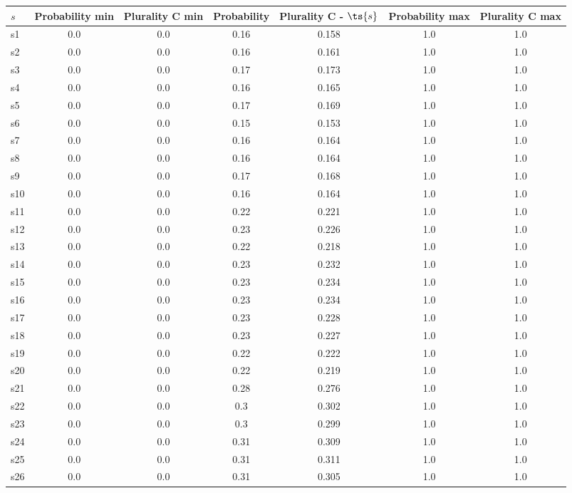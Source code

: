\documentclass{article}
\begin{document}
\noindent\begin{tabular}{|l|c|c|c|c|c|c|}
\hline
$s$& Probability min & Plurality C min & Probability & Plurality C - $\ts{s}$ & Probability max & Plurality C max\\
\hline
s1 &0.0 & 0.0 & 0.16 & 0.158 & 1.0 & 1.0\\
\hline
s2 &0.0 & 0.0 & 0.16 & 0.161 & 1.0 & 1.0\\
\hline
s3 &0.0 & 0.0 & 0.17 & 0.173 & 1.0 & 1.0\\
\hline
s4 &0.0 & 0.0 & 0.16 & 0.165 & 1.0 & 1.0\\
\hline
s5 &0.0 & 0.0 & 0.17 & 0.169 & 1.0 & 1.0\\
\hline
s6 &0.0 & 0.0 & 0.15 & 0.153 & 1.0 & 1.0\\
\hline
s7 &0.0 & 0.0 & 0.16 & 0.164 & 1.0 & 1.0\\
\hline
s8 &0.0 & 0.0 & 0.16 & 0.164 & 1.0 & 1.0\\
\hline
s9 &0.0 & 0.0 & 0.17 & 0.168 & 1.0 & 1.0\\
\hline
s10 &0.0 & 0.0 & 0.16 & 0.164 & 1.0 & 1.0\\
\hline
s11 &0.0 & 0.0 & 0.22 & 0.221 & 1.0 & 1.0\\
\hline
s12 &0.0 & 0.0 & 0.23 & 0.226 & 1.0 & 1.0\\
\hline
s13 &0.0 & 0.0 & 0.22 & 0.218 & 1.0 & 1.0\\
\hline
s14 &0.0 & 0.0 & 0.23 & 0.232 & 1.0 & 1.0\\
\hline
s15 &0.0 & 0.0 & 0.23 & 0.234 & 1.0 & 1.0\\
\hline
s16 &0.0 & 0.0 & 0.23 & 0.234 & 1.0 & 1.0\\
\hline
s17 &0.0 & 0.0 & 0.23 & 0.228 & 1.0 & 1.0\\
\hline
s18 &0.0 & 0.0 & 0.23 & 0.227 & 1.0 & 1.0\\
\hline
s19 &0.0 & 0.0 & 0.22 & 0.222 & 1.0 & 1.0\\
\hline
s20 &0.0 & 0.0 & 0.22 & 0.219 & 1.0 & 1.0\\
\hline
s21 &0.0 & 0.0 & 0.28 & 0.276 & 1.0 & 1.0\\
\hline
s22 &0.0 & 0.0 & 0.3 & 0.302 & 1.0 & 1.0\\
\hline
s23 &0.0 & 0.0 & 0.3 & 0.299 & 1.0 & 1.0\\
\hline
s24 &0.0 & 0.0 & 0.31 & 0.309 & 1.0 & 1.0\\
\hline
s25 &0.0 & 0.0 & 0.31 & 0.311 & 1.0 & 1.0\\
\hline
s26 &0.0 & 0.0 & 0.31 & 0.305 & 1.0 & 1.0\\

\end{tabular}
\end{document}
